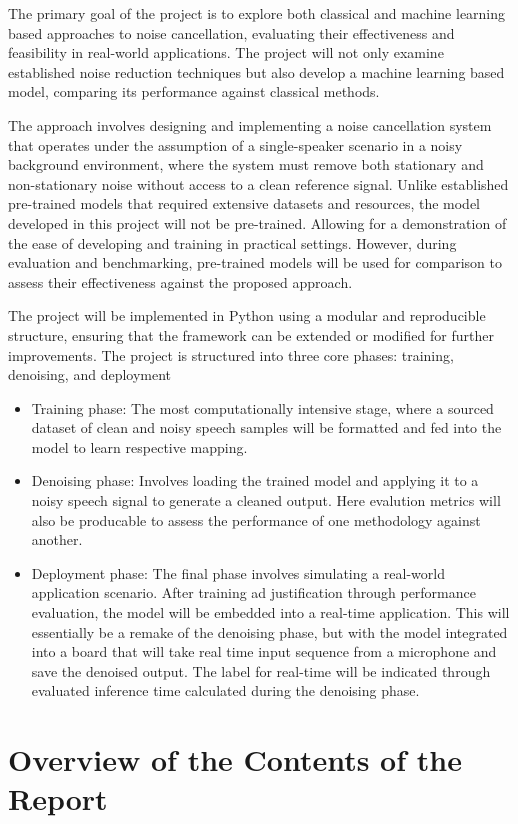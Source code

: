 The primary goal of the project is to explore both classical and machine learning based approaches to noise cancellation, evaluating their effectiveness and feasibility in real-world applications. The project will not only examine established noise reduction techniques but also develop a machine learning based model, comparing its performance against classical methods.

The approach involves designing and implementing a noise cancellation system that operates under the assumption of a single-speaker scenario in a noisy background environment, where the system must remove both stationary and non-stationary noise without access to a clean reference signal. Unlike established pre-trained models that required extensive datasets and resources, the model developed in this project will not be pre-trained. Allowing for a demonstration of the ease of developing and training in practical settings. However, during evaluation and benchmarking, pre-trained models will be used for comparison to assess their effectiveness against the proposed approach.

The project will be implemented in Python using a modular and reproducible structure, ensuring that the framework can be extended or modified for further improvements. The project is structured into three core phases: training, denoising, and deployment
\begin{itemize}
    \item Training phase: The most computationally intensive stage, where a sourced dataset of clean and noisy speech samples will be formatted and fed into the model to learn respective mapping.
    \item Denoising phase: Involves loading the trained model and applying it to a noisy speech signal to generate a cleaned output. Here evalution metrics will also be producable to assess the performance of one methodology against another.
    \item Deployment phase: The final phase involves simulating a real-world application scenario. After training ad justification through performance evaluation, the model will be embedded into a real-time application. This will essentially be a remake of the denoising phase, but with the model integrated into a board that will take real time input sequence from a microphone and save the denoised output. The label for real-time will be indicated through evaluated inference time calculated during the denoising phase.
\end{itemize}


\section{Overview of the Contents of the Report}